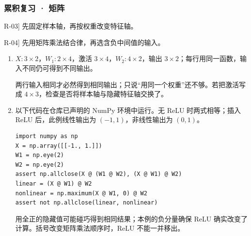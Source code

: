 \subsubsection*{累积复习 · 矩阵}
\begin{answerhints}
\item[\hyperref[exercise:review-matrix-shapes]{R-03}] \leavevmode{}\label{hint:review-matrix-shapes}先固定样本轴，再按权重改变特征轴。
\item[\hyperref[exercise:review-matrix-nonlinearity]{R-04}] \leavevmode{}\label{hint:review-matrix-nonlinearity}先用矩阵乘法结合律，再选含负中间值的输入。
\end{answerhints}
\begin{enumerate}[label={},leftmargin=4.8em,itemsep=4pt]
\item[\textbf{\hyperref[exercise:review-matrix-shapes]{R-03.}}] \leavevmode{}\label{solution:R-03}\label{solution:review-matrix-shapes}$X:3\times2$，$W_1:2\times4$，激活 $3\times4$，$W_2:4\times2$，输出 $3\times2$；每行用同一函数，输入不同仍可得到不同输出。\par 两行输入相同才必然得到相同输出；只说“用同一个权重”还不够。若把激活写成 $4\times3$，检查是否将样本轴与隐藏特征轴交换了。
\item[\textbf{\hyperref[exercise:review-matrix-nonlinearity]{R-04.}}] \leavevmode{}\label{solution:R-04}\label{solution:review-matrix-nonlinearity}以下代码在仓库已声明的 NumPy 环境中运行。无 ReLU 时两式相等；插入 ReLU 后，此例线性输出为 $(-1,1)$，非线性输出为 $(0,1)$。\par\nobreak
\begin{samepage}\begin{verbatim}
import numpy as np
X = np.array([[-1., 1.]])
W1 = np.eye(2)
W2 = np.eye(2)
assert np.allclose(X @ (W1 @ W2), (X @ W1) @ W2)
linear = (X @ W1) @ W2
nonlinear = np.maximum(X @ W1, 0) @ W2
assert not np.allclose(linear, nonlinear)
\end{verbatim}\end{samepage}
用全正的隐藏值可能碰巧得到相同结果；本例的负分量确保 ReLU 确实改变了计算。括号改变矩阵乘法顺序时，ReLU 不能一并移出。
\end{enumerate}
